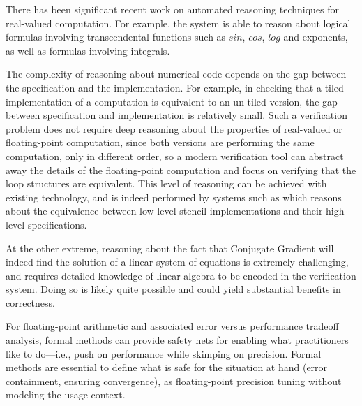 There has been significant recent work on automated reasoning techniques for real-valued computation. For example, the  system is able to reason about logical formulas involving transcendental functions such as $sin$, $cos$, $log$ and exponents, as well as formulas involving integrals. 
%


The complexity of reasoning about numerical code depends on the gap between the specification and the implementation. For example, in checking that a tiled implementation of a computation is equivalent to an un-tiled version, the gap between specification and implementation is relatively small. Such a verification problem does not require deep reasoning about the properties of real-valued or floating-point computation, since both versions are performing the same computation, only in different order, so a modern verification tool can abstract away the details of the floating-point computation and focus on verifying that the loop structures are equivalent. This level of reasoning can be achieved with existing technology, and is indeed performed by systems such as  which reasons about the equivalence between low-level stencil implementations and their high-level specifications. 


At the other extreme, reasoning about the fact that Conjugate Gradient will indeed find the solution of a linear system of equations is extremely challenging, and requires detailed knowledge of linear algebra to be encoded in the verification system. Doing so is likely quite possible and could yield substantial benefits in correctness. 

For floating-point arithmetic and associated error versus performance tradeoff analysis, formal methods can provide safety nets for enabling what practitioners like to do---i.e., push
on performance while skimping on precision.
Formal methods are essential
to define what is safe for the
situation at hand (error containment, ensuring convergence), as floating-point precision tuning 
 without modeling the usage context.

